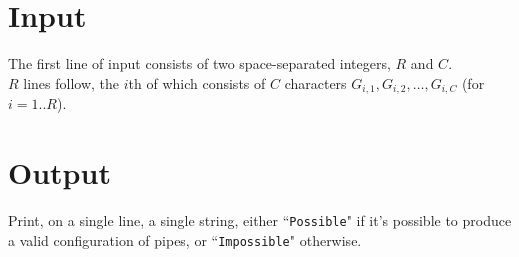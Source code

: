 \section*{Input}
The first line of input consists of two space-separated integers, $R$ and $C$.\\
$R$ lines follow, the $i$th of which consists of $C$ characters $G_{i,1}, G_{i,2}, \dots, G_{i,C}$ (for $i = 1..R$).

\section*{Output}
Print, on a single line, a single string, either ``\texttt{Possible}" if it's possible to produce a valid configuration of pipes, or ``\texttt{Impossible}" otherwise.
